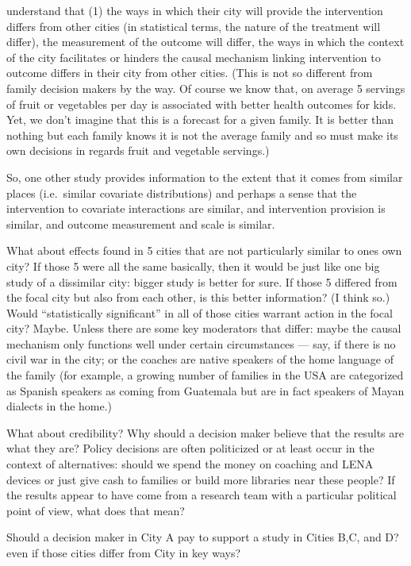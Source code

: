 \documentclass[
]{article}
\begin{document}
understand that (1) the ways in which their city will provide the
intervention differs from other cities (in statistical terms, the nature
of the treatment will differ), the measurement of the outcome will
differ, the ways in which the context of the city facilitates or hinders
the causal mechanism linking intervention to outcome differs in their
city from other cities. (This is not so different from family decision
makers by the way. Of course we know that, on average 5 servings of
fruit or vegetables per day is associated with better health outcomes
for kids. Yet, we don't imagine that this is a forecast for a given
family. It is better than nothing but each family knows it is not the
average family and so must make its own decisions in regards fruit and
vegetable servings.)

So, one other study provides information to the extent that it comes
from similar places (i.e.~similar covariate distributions) and perhaps a
sense that the intervention to covariate interactions are similar, and
intervention provision is similar, and outcome measurement and scale is
similar.

What about effects found in 5 cities that are not particularly similar
to ones own city? If those 5 were all the same basically, then it would
be just like one big study of a dissimilar city: bigger study is better
for sure. If those 5 differed from the focal city but also from each
other, is this better information? (I think so.) Would ``statistically
significant'' in all of those cities warrant action in the focal city?
Maybe. Unless there are some key moderators that differ: maybe the
causal mechanism only functions well under certain circumstances ---
say, if there is no civil war in the city; or the coaches are native
speakers of the home language of the family (for example, a growing
number of families in the USA are categorized as Spanish speakers as
coming from Guatemala but are in fact speakers of Mayan dialects in the
home.)

What about credibility? Why should a decision maker believe that the
results are what they are? Policy decisions are often politicized or at
least occur in the context of alternatives: should we spend the money on
coaching and LENA devices or just give cash to families or build more
libraries near these people? If the results appear to have come from a
research team with a particular political point of view, what does that
mean?

Should a decision maker in City A pay to support a study in Cities B,C,
and D? even if those cities differ from City in key ways?
\end{document}
